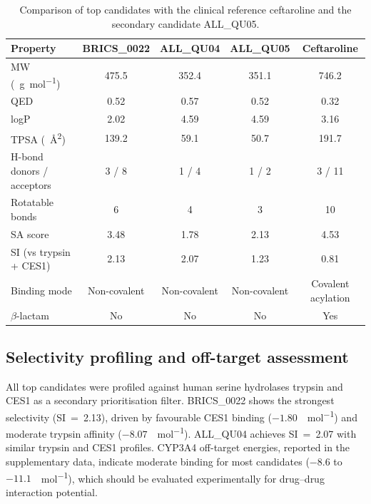 \documentclass[12pt]{article}
\begin{document}
\begin{table}[H]
  \centering
  \caption{Comparison of top candidates with the clinical reference ceftaroline and the secondary candidate ALL\_QU05.}
  \label{tab:comparison}
  \begin{tabular}{lcccc}
    \toprule
    Property & BRICS\_0022 & ALL\_QU04 & ALL\_QU05 & Ceftaroline \\
    \midrule
    MW (\SI{}{\g\per\mol}) & 475.5 & 352.4 & 351.1 & 746.2 \\
    QED & 0.52 & 0.57 & 0.52 & 0.32 \\
    logP & 2.02 & 4.59 & 4.59 & 3.16 \\
    TPSA (\SI{}{\square\angstrom}) & 139.2 & 59.1 & 50.7 & 191.7 \\
    H-bond donors / acceptors & 3 / 8 & 1 / 4 & 1 / 2 & 3 / 11 \\
    Rotatable bonds & 6 & 4 & 3 & 10 \\
    SA score & 3.48 & 1.78 & 2.13 & 4.53 \\
    SI (vs trypsin + CES1) & 2.13 & 2.07 & 1.23 & 0.81 \\
    Binding mode & Non-covalent & Non-covalent & Non-covalent & Covalent acylation \\
    $\beta$-lactam & No & No & No & Yes \\
    \bottomrule
  \end{tabular}
\end{table}

\subsection{Selectivity profiling and off-target assessment}
All top candidates were profiled against human serine hydrolases trypsin and CES1 as a secondary prioritisation filter. BRICS\_0022 shows the strongest selectivity (SI~=~2.13), driven by favourable CES1 binding ($-1.80$~\si{\kcal\per\mol}) and moderate trypsin affinity ($-8.07$~\si{\kcal\per\mol}). ALL\_QU04 achieves SI~=~2.07 with similar trypsin and CES1 profiles. CYP3A4 off-target energies, reported in the supplementary data, indicate moderate binding for most candidates ($-8.6$ to $-11.1$~\si{\kcal\per\mol}), which should be evaluated experimentally for drug--drug interaction potential.
\end{document}
